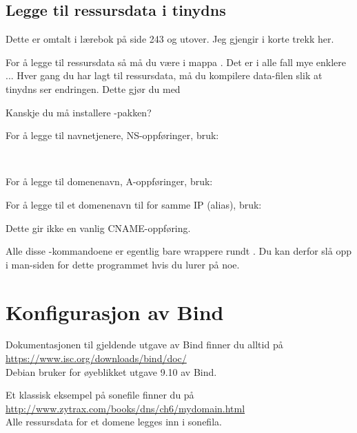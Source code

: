 \subsection{Legge til ressursdata i tinydns}


Dette er omtalt i lærebok på side 243 og utover. Jeg gjengir i korte trekk her.

For å legge til ressursdata så må du være i mappa .
Det er i alle fall mye enklere ... Hver gang du har lagt til ressursdata, 
må du kompilere data-filen slik at tinydns ser endringen. Dette gjør du med 


Kanskje du må installere -pakken?

For å legge til navnetjenere, NS-oppføringer, bruk:

\\

For å legge til domenenavn, A-oppføringer, bruk:


For å legge til et domenenavn til for samme IP (alias), bruk:


Dette gir ikke en vanlig CNAME-oppføring.

Alle disse -kommandoene er egentlig bare wrappere rundt
. Du kan derfor slå opp i man-siden for dette programmet
hvis du lurer på noe.

\section{Konfigurasjon av Bind}


Dokumentasjonen til gjeldende utgave av Bind finner du alltid på\\
\url{https://www.isc.org/downloads/bind/doc/} \cite{docs:bind}\\
Debian bruker for øyeblikket utgave 9.10 av Bind.

Et klassisk eksempel på sonefile finner du på\\
\url{http://www.zytrax.com/books/dns/ch6/mydomain.html}\\
Alle ressursdata for et domene legges inn i sonefila.

